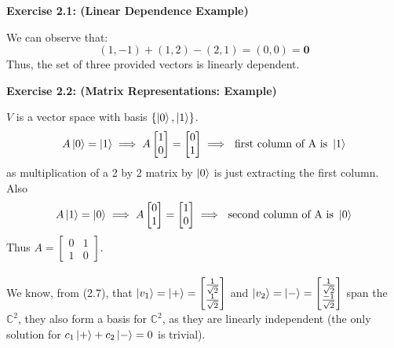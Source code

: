 \documentclass{article}
\begin{document}
\begin{framed}
    \noindent \textbf{Exercise 2.1: (Linear Dependence Example)}
    
    \medskip
    We can observe that:
    $$
    (1, -1) + (1, 2) - (2, 1) = (0,0) = \boldsymbol{0}
    $$
    Thus, the set of three provided vectors is linearly dependent.
\end{framed}

\bigskip

\begin{framed}
    \noindent \textbf{Exercise 2.2: (Matrix Representations: Example)}

    \medskip
    $V$ is a vector space with basis $\{ \ket{0}, \ket{1} \}$. \\
    $$
        A\ket{0} = \ket{1} \implies A\begin{bmatrix} 1 \\ 0 \end{bmatrix} = \begin{bmatrix} 0 \\ 1 \end{bmatrix} \implies \text{ first column of A is } 
        \ket{1}
    $$
    as multiplication of a 2 by 2 matrix by  $\ket{0}$ is just extracting the first column. Also
    $$
        A\ket{1} = \ket{0} \implies A\begin{bmatrix} 0 \\ 1 \end{bmatrix} = \begin{bmatrix} 1 \\ 0 \end{bmatrix} \implies \text{ second column of A is } \ket{0}
    $$
    Thus $A = \begin{bmatrix} 0 & 1 \\ 1 & 0 \end{bmatrix}$. \\ \\ 
    We know, from (2.7), that $\ket{v_1} = \ket{+} = \begin{bmatrix} \frac{1}{\sqrt{2}} \\ \frac{1}{\sqrt{2}} \end{bmatrix}$ and $\ket{v_2} = \ket{-} = \begin{bmatrix} \frac{1}{\sqrt{2}} \\ \frac{-1}{\sqrt{2}} \end{bmatrix}$ span the $\mathbb{C}^{2}$, they also form a basis for $\mathbb{C}^2$, as they are linearly independent (the only solution for $c_1\ket{+} + c_2\ket{-} = 0$ is trivial). \\ \\ 

\end{framed}
\end{document}
